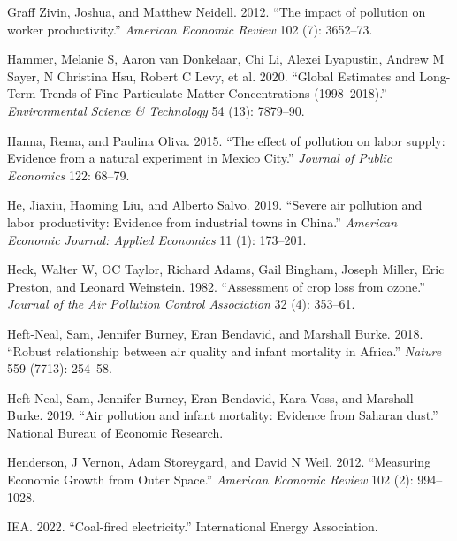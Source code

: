 \documentclass[
]{article}
\newlength{\cslhangindent}
\newlength{\cslentryspacingunit} %
\newenvironment{CSLReferences}[2] %
 {%
  \setlength{\parindent}{0pt}
  \ifodd #1
  \let\oldpar\par
  \def\par{\hangindent=\cslhangindent\oldpar}
  \fi
  \setlength{\parskip}{#2\cslentryspacingunit}
 }%
 {}
\begin{document}
\begin{CSLReferences}{1}{0}
\leavevmode{}%
Graff Zivin, Joshua, and Matthew Neidell. 2012. {``{The impact of pollution on worker productivity}.''} \emph{{American Economic Review}} 102 (7): 3652--73.

\leavevmode{}%
Hammer, Melanie S, Aaron van Donkelaar, Chi Li, Alexei Lyapustin, Andrew M Sayer, N Christina Hsu, Robert C Levy, et al. 2020. {``Global Estimates and Long-Term Trends of Fine Particulate Matter Concentrations (1998--2018).''} \emph{{Environmental Science \& Technology}} 54 (13): 7879--90.

\leavevmode{}%
Hanna, Rema, and Paulina Oliva. 2015. {``{The effect of pollution on labor supply: Evidence from a natural experiment in Mexico City}.''} \emph{{Journal of Public Economics}} 122: 68--79.

\leavevmode{}%
He, Jiaxiu, Haoming Liu, and Alberto Salvo. 2019. {``{Severe air pollution and labor productivity: Evidence from industrial towns in China}.''} \emph{{American Economic Journal: Applied Economics}} 11 (1): 173--201.

\leavevmode{}%
Heck, Walter W, OC Taylor, Richard Adams, Gail Bingham, Joseph Miller, Eric Preston, and Leonard Weinstein. 1982. {``{Assessment of crop loss from ozone}.''} \emph{{Journal of the Air Pollution Control Association}} 32 (4): 353--61.

\leavevmode{}%
Heft-Neal, Sam, Jennifer Burney, Eran Bendavid, and Marshall Burke. 2018. {``{Robust relationship between air quality and infant mortality in Africa}.''} \emph{Nature} 559 (7713): 254--58.

\leavevmode{}%
Heft-Neal, Sam, Jennifer Burney, Eran Bendavid, Kara Voss, and Marshall Burke. 2019. {``{Air pollution and infant mortality: Evidence from Saharan dust}.''} {National Bureau of Economic Research}.

\leavevmode{}%
Henderson, J Vernon, Adam Storeygard, and David N Weil. 2012. {``Measuring Economic Growth from Outer Space.''} \emph{{American Economic Review}} 102 (2): 994--1028.

\leavevmode{}%
IEA. 2022. {``{Coal-fired electricity}.''} {International Energy Association}.


\end{CSLReferences}
\end{document}
